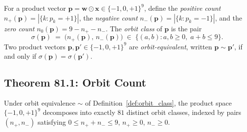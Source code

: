\begin{definition}
\label{def:orbit_class}
For a product vector $\mathbf{p} = \mathbf{w} \odot \mathbf{x} \in \{-1,0,+1\}^9$,
define the \emph{positive count} $n_{+}(\mathbf{p}) = |\{k : p_k = +1\}|$,
the \emph{negative count} $n_{-}(\mathbf{p}) = |\{k : p_k = -1\}|$,
and the \emph{zero count} $n_0(\mathbf{p}) = 9 - n_{+} - n_{-}$.
The \emph{orbit class} of $\mathbf{p}$ is the pair
\[
  \sigma(\mathbf{p}) \;=\; \bigl(n_{+}(\mathbf{p}),\, n_{-}(\mathbf{p})\bigr)
  \;\in\; \bigl\{(a,b) : a,b \geq 0,\; a+b \leq 9\bigr\}.
\]
Two product vectors $\mathbf{p}, \mathbf{p}' \in \{-1,0,+1\}^9$ are
\emph{orbit-equivalent}, written $\mathbf{p} \sim \mathbf{p}'$, if and only if
$\sigma(\mathbf{p}) = \sigma(\mathbf{p}')$.
\end{definition}

\subsection{Theorem 81.1: Orbit Count}

\begin{theorem}
\label{thm:orbit_count_81}
Under orbit equivalence $\sim$ of Definition~\ref{def:orbit_class}, the
product space $\{-1,0,+1\}^9$ decomposes into exactly $81$ distinct orbit
classes, indexed by pairs $(n_{+}, n_{-})$ satisfying $0 \leq n_{+} + n_{-} \leq 9$,
$n_{+} \geq 0$, $n_{-} \geq 0$.
\end{theorem}


